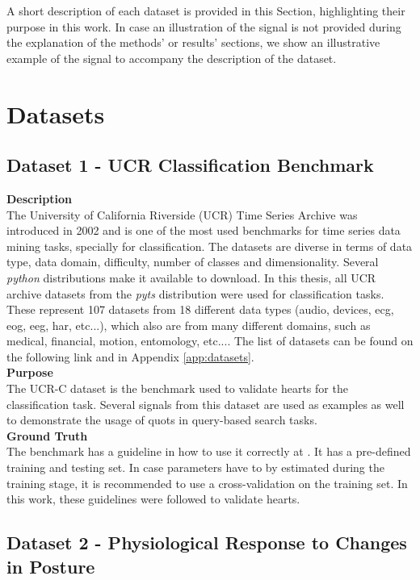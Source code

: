 A short description of each dataset is provided in this Section, highlighting their purpose in this work. In case an illustration of the signal is not provided during the explanation of the methods' or results' sections, we show an illustrative example of the signal to accompany the description of the dataset.

\section{Datasets}
\label{sec:dataset}

\subsection{Dataset 1 - UCR Classification Benchmark}
\label{sec:dat_ucr}
\textbf{Description}\hfill\\
The University of California Riverside (UCR) Time Series Archive was introduced in 2002 and is one of the most used benchmarks for time series data mining tasks, specially for classification. The datasets are diverse in terms of data type, data domain, difficulty, number of classes and dimensionality\cite{ucr}. Several \textit{python} distributions make it available to download. In this thesis, all UCR archive datasets from the \textit{pyts} distribution were used for classification tasks. These represent 107 datasets from 18 different data types (audio, devices, \gls{ecg}, \gls{eog}, \gls{eeg}, \gls{har}, etc...), which also are from many different domains, such as medical, financial, motion, entomology, etc...\cite{ucr}. The list of datasets can be found on the following link \cite{ucr_site} and in Appendix \ref{app:datasets}.\\
\textbf{Purpose}\hfill\\
The UCR-C dataset is the benchmark used to validate \gls{hearts} for the classification task. Several signals from this dataset are used as examples as well to demonstrate the usage of \gls{quots} in query-based search tasks.\\
\textbf{Ground Truth}\hfill\\
The benchmark has a guideline in how to use it correctly at \cite{ucr}. It has a pre-defined training and testing set. In case parameters have to by estimated during the training stage, it is recommended to use a cross-validation on the training set. In this work, these guidelines were followed to validate \gls{hearts}.

\subsection{Dataset 2 - Physiological Response to Changes in Posture}
\label{dat:dataset2}

